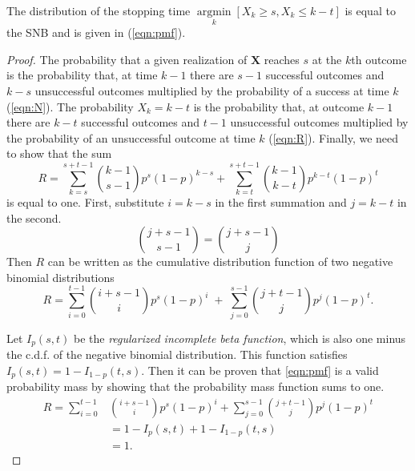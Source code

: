 \documentclass[12pt]{article}         %
\DeclareMathOperator*{\argmin}{argmin}
\newcommand*{\argminl}{\argmin\limits}
\begin{document}
\begin{prop}
The distribution of the stopping time $\argminl_k [X_k \geq s, X_k \leq k-t]$ 
is equal to the SNB and is given in (\ref{eqn:pmf}). 
\end{prop}
\begin{proof}

The probability that a given realization of $\mathbf{X}$ reaches $s$ at 
the $k$th outcome is the probability that, at time $k-1$ there are $s-1$ 
successful outcomes and $k-s$ unsuccessful outcomes multiplied by 
the probability of a 
success at time $k$ (\ref{eqn:N}). The probability $X_k = k-t$ 
is the probability that, at outcome $k-1$ there are $k-t$ successful outcomes 
and $t-1$ unsuccessful outcomes multiplied by the probability of an 
unsuccessful outcome at time $k$ (\ref{eqn:R}).  Finally, we need to show that 
the sum
\begin{equation} \label{eqn:sum_proof}
R = \sum_{k=s}^{s+t-1} {k-1 \choose s-1} p^s (1-p)^{k-s} + \sum_{k=t}^{s+t-1} {k-1 \choose k-t} p^{k-t} (1-p)^t
\end{equation}
is equal to one.
First, substitute $i=k-s$ in the first summation and
$j=k-t$ in the second. 
\begin{equation*}
{j+s-1 \choose s-1} = {j+s-1 \choose j}
\end{equation*}
Then %
$R$ can be written
as the cumulative distribution function of two 
negative binomial distributions
\begin{equation} \label{eqn:transformed_sum}
R = \sum_{i=0}^{t-1} {i+s-1 \choose i} p^s (1-p)^i \; + \;
\sum_{j=0}^{s-1} {j+t-1 \choose j} p^j (1-p)^t.
\end{equation}

Let $I_p(s, t)$ be the {\em regularized incomplete beta function}, which is 
also one minus the c.d.f. of the negative binomial distribution. This
function satisfies $I_p(s, t) = 1-I_{1-p}(t, s)$.  Then it can be proven
that \ref{eqn:pmf} is a valid probability mass by showing that the
probability mass function sums to one.
\begin{align*}
R = \sum_{i=0}^{t-1} &{i+s-1 \choose i} p^s (1-p)^i +
\sum_{j=0}^{s-1}  {j+t-1 \choose j} p^j  (1-p)^t \\
   &= 1-I_p(s, t) + 1 - I_{1-p}(t, s) \\
   &= 1. 
\end{align*}
\end{proof}
\end{document}
